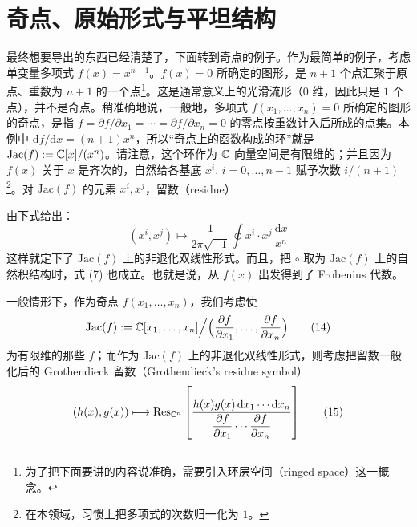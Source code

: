 \section{奇点、原始形式与平坦结构}

最终想要导出的东西已经清楚了，下面转到奇点的例子。作为最简单的例子，考虑单变量多项式 $f(x)=x^{n+1}$。$f(x)=0$ 所确定的图形，是 $n+1$ 个点汇聚于原点、重数为 $n+1$ 的一个点\footnote{为了把下面要讲的内容说准确，需要引入环层空间（ringed space）这一概念。}。这是通常意义上的光滑流形（$0$ 维，因此只是 $1$ 个点），并不是奇点。稍准确地说，一般地，多项式 $f(x_1,\dots,x_n)=0$ 所确定的图形的奇点，是指 $f=\partial f/\partial x_1=\cdots=\partial f/\partial x_n=0$ 的零点按重数计入后所成的点集。本例中 $\mathrm{d}f/\mathrm{d}x=(n+1)x^n$，所以“奇点上的函数构成的环”就是 $\mathrm{Jac}(f):=\mathbb{C}[x]/(x^n)$。请注意，这个环作为 $\mathbb{C}$ 向量空间是有限维的；并且因为 $f(x)$ 关于 $x$ 是齐次的，自然给各基底 $x^i,\,i=0,\dots,n-1$ 赋予次数 $i/(n+1)$\footnote{在本领域，习惯上把多项式的次数归一化为 $1$。}。对 $\mathrm{Jac}(f)$ 的元素 $x^i,x^j$，留数（residue）

由下式给出：
\begin{equation}
  (x^i,x^j)\longmapsto\frac{1}{2\pi\sqrt{-1}}\oint x^i\cdot x^j\,\frac{\mathrm{d}x}{x^n}
  \tag{13}
\end{equation}
这样就定下了 $\mathrm{Jac}(f)$ 上的非退化双线性形式。而且，把 $\circ$ 取为 $\mathrm{Jac}(f)$ 上的自然积结构时，式 (7) 也成立。也就是说，从 $f(x)$ 出发得到了 Frobenius 代数。

一般情形下，作为奇点 $f(x_1,\dots,x_n)$，我们考虑使
\begin{equation}
  \mathrm{Jac}(f):=\mathbb{C}[x_1,\dots,x_n]\Big/\Bigl(\frac{\partial f}{\partial x_1},\dots,\frac{\partial f}{\partial x_n}\Bigr)
  \tag{14}
\end{equation}
为有限维的那些 $f$；而作为 $\mathrm{Jac}(f)$ 上的非退化双线性形式，则考虑把留数一般化后的 Grothendieck 留数（Grothendieck's residue symbol）
\begin{equation}
  (h(x),g(x))\longmapsto \mathrm{Res}_{\mathbb{C}^n}
  \left[\frac{h(x)g(x)\,\mathrm{d}x_1\cdots \mathrm{d}x_n}
  {\dfrac{\partial f}{\partial x_1}\cdots\dfrac{\partial f}{\partial x_n}}\right]
  \tag{15}
\end{equation}

